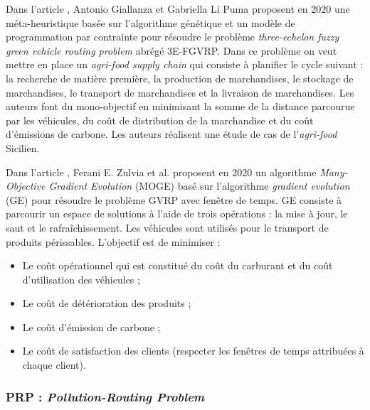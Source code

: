 
Dans l'article \cite{Antonio_2020}, Antonio Giallanza et Gabriella Li Puma proposent en 2020 une méta-heuristique basée sur l'algorithme génétique et un modèle de programmation par contrainte pour résoudre le problème \textit{three-echelon fuzzy green vehicle routing problem} abrégé 3E-FGVRP. Dans ce problème on veut mettre en place un \textit{agri-food supply chain} qui consiste à planifier le cycle suivant : la recherche de matière première, la production de marchandises, le stockage de marchandises, le transport de marchandises et la livraison de marchandises. Les auteurs font du mono-objectif en minimisant la somme de la distance parcourue par les véhicules, du coût de distribution de la marchandise et du coût d'émissions de carbone. Les auteurs réalisent une étude de cas de l'\textit{agri-food} Sicilien.

Dans l'article \cite{Ferani_2020}, Ferani E. Zulvia et al. proposent en 2020 un algorithme \textit{Many-Objective Gradient Evolution} (MOGE) basé sur l'algorithme \textit{gradient evolution} (GE) pour résoudre le problème GVRP avec fenêtre de temps. GE consiste à parcourir un espace de solutions à l'aide de trois opérations : la mise à jour, le saut et le rafraîchissement. Les véhicules sont utilisés pour le transport de produits périssables. L'objectif est de minimiser :
\begin{itemize}[label=$\square$]
	\item Le coût opérationnel qui est constitué du coût du carburant et du coût d'utilisation des véhicules ;
	\item Le coût de détérioration des produits ;
	\item Le coût d'émission de carbone ;
	\item Le coût de satisfaction des clients (respecter les fenêtres de temps attribuées à chaque client).
\end{itemize}


\subsubsection{PRP : \textit{Pollution-Routing Problem}}


